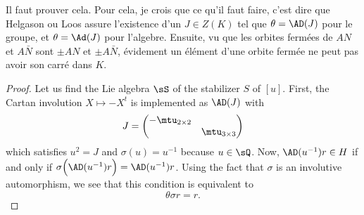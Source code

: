 \begin{probleme}
Il faut prouver cela. Pour cela, je crois que ce qu'il faut faire, c'est dire que Helgason ou Loos assure l'existence d'un $J\in Z(K)$ tel que $\theta=\AD(J)$ pour le groupe, et $\theta=\Ad(J)$ pour l'algebre. Ensuite, vu que les orbites fermées de $AN$ et $A\bar N$ sont $\pm AN$ et $\pm A\bar N$, évidement un élément d'une orbite fermée ne peut pas avoir son carré dans $K$.
\label{ProbAdJthetaj}
\end{probleme}

\begin{proof}
Let us find the Lie algebra $\sS$ of the stabilizer $S$ of $[u]$. First, the Cartan involution $X\mapsto -X^{t}$ is implemented as $\AD(J)$ with
\[ 
  J=\begin{pmatrix}
-\mtu_{2\times 2}\\
&\mtu_{3\times 3}
\end{pmatrix}
\]
which satisfies $u^{2}=J$ and $\sigma(u)=u^{-1}$ because $u\in\sQ$. Now, $\AD(u^{-1})r\in H$ if and only if $\sigma\Big( \AD(u^{-1})r \Big)=\AD(u^{-1})r$. Using the fact that $\sigma$ is an involutive automorphism, we see that this condition is equivalent to
\begin{equation}
\theta\sigma r=r.
\end{equation}


\end{proof}
